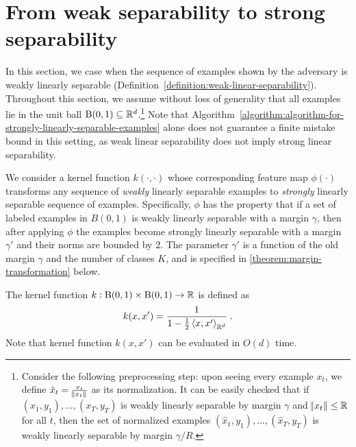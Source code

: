 \section{From weak separability to strong separability}
\label{section:from-weak-separability-to-strong-separability}

In this section, we case when the sequence of examples shown by the adversary is
weakly linearly separable
(Definition~\ref{definition:weak-linear-separability}). Throughout this section,
we assume without loss of generality that all examples lie in the unit ball
$\operatorname{B}(0,1) \subseteq \mathbb{R}^d$.\footnote{Consider the following preprocessing step:
upon seeing every example $x_t$, we define $\hat{x}_t = \frac{x_t}{\norm{x_t}}$
as its normalization. It can be easily checked that if $(x_1,y_1), \dots,
(x_T,y_T)$ is weakly linearly separable by margin $\gamma$ and $\norm{x_t} \le
\mathbb{R}$ for all $t$, then the set of normalized examples $(\hat{x}_1,y_1), \dots,
(\hat{x}_T,y_T)$ is weakly linearly separable by margin $\gamma/R$.} Note that
Algorithm~\ref{algorithm:algorithm-for-strongly-linearly-separable-examples}
alone does not guarantee a finite mistake bound in this setting, as weak linear
separability does not imply strong linear separability.

We consider a kernel function $k(\cdot, \cdot)$ whose corresponding feature map
$\phi(\cdot)$ transforms any sequence of \emph{weakly} linearly separable
examples to \emph{strongly} linearly separable sequence of examples.
Specifically, $\phi$ has the property that if a set of labeled examples in
$B(0,1)$ is weakly linearly separable with a margin $\gamma$, then after
applying $\phi$ the examples become strongly linearly separable with a margin
$\gamma'$ and their norms are bounded by $2$. The parameter $\gamma'$ is a
function of the old margin $\gamma$ and the number of classes $K$, and is
specified in \autoref{theorem:margin-transformation} below.

The kernel function $k:\operatorname{B}(0,1) \times \operatorname{B}(0,1) \to \mathbb{R}$ is defined as
$$
k(x,x') = \frac{1}{1 - \frac{1}{2}\left\langle x, x' \right\rangle_{\mathbb{R}^d}} \; .
$$
Note that kernel function $k(x,x')$ can be evaluated in $O(d)$ time.

